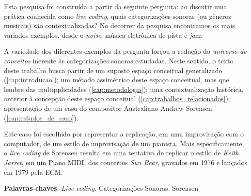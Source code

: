 \setlength{\absparsep}{18pt} %
\begin{resumo}
Esta pesquisa foi construída a partir da seguinte pergunta: ao discutir uma prática conhecida como \textit{live coding}, quais categorizações sonoras (ou gêneros musicais) são contextualizadas? No decorrer da pesquisa encontramos os mais variados exemplos, desde o \emph{noise}, música eletrônica de pista e \emph{jazz}.

A variedade dos diferentes exemplos da pergunta forçou a redução do \emph{universo de conceitos} inerente às categorizações sonoras estudadas. Neste sentido, o texto deste trabalho busca partir de um suposto espaço conceitual generalizado (\autoref{cap:introducao}); um método assimétrico deste espaço conceitual, mas que lembre das multipplicidades (\autoref{cap:metodologia}); uma contextualização histórica, anterior à concepção deste espaço conceitual (\autoref{cap:trabalhos_relacionados}); apresentação de um caso do compositor Australiano Andrew Sorensen (\autoref{cap:estudos_de_caso}).

Este caso foi escolhido por representar a replicação, em uma improvisação com o computador, de um estilo de improvisação de um pianista. Mais especificamente, o \emph{live coding} de Sorensen resulta em uma tentativa de replicar o estilo de \emph{Keith Jarret}, em um Piano MIDI, dos concertos \emph{Sun Bear}, gravados em 1976 e lançados em 1979 pela ECM.

\textbf{Palavras-chaves}: \textit{Live coding}. Categorizações Sonoras. Sorensen
\end{resumo}

\begin{comment}
\begin{resumo}[Abstract]
 \begin{otherlanguage*}{english}
   This is the english abstract.

   \vspace{\onelineskip}
 
   \noindent 
   \textbf{Key-words}: latex. abntex. text editoration.
 \end{otherlanguage*}
\end{resumo}

\begin{resumo}[Résumé]
 \begi'n{otherlanguage*}{french}
    Il s'agit d'un résumé en français.
 
   \textbf{Mots-clés}: latex. abntex. publication de textes.
 \end{otherlanguage*}
\end{resumo}

\begin{resumo}[Resumen]
 \begin{otherlanguage*}{spanish}
   Este es el resumen en español.
  
   \textbf{Palabras clave}: latex. abntex. publicación de textos.
 \end{otherlanguage*}
\end{resumo}
\end{comment}